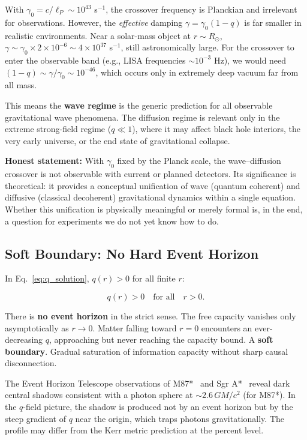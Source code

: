 \documentclass[aps,prd,twocolumn,showpacs,superscriptaddress,preprintnumbers]{revtex4-2}
\begin{document}
With $\gamma_0=c/\ell_P\sim10^{43}$ s$^{-1}$, the crossover frequency is Planckian and irrelevant for observations.
However, the \emph{effective} damping $\gamma=\gamma_0(1-q)$ is far smaller in realistic environments.
Near a solar-mass object at $r\sim R_\odot$, $\gamma\sim\gamma_0\times2\times10^{-6}\sim4\times10^{37}$ s$^{-1}$, still astronomically large.
For the crossover to enter the observable band (e.g., LISA frequencies $\sim10^{-3}$ Hz), we would need $(1-q)\sim\gamma/\gamma_0\sim10^{-46}$, which occurs only in extremely deep vacuum far from all mass.

This means the \textbf{wave regime} is the generic prediction for all observable gravitational wave phenomena.
The diffusion regime is relevant only in the extreme strong-field regime ($q\ll1$), where it may affect black hole interiors, the very early universe, or the end state of gravitational collapse.

\textbf{Honest statement:} With $\gamma_0$ fixed by the Planck scale, the wave--diffusion crossover is not observable with current or planned detectors.
Its significance is theoretical: it provides a conceptual unification of wave (quantum coherent) and diffusive (classical decoherent) gravitational dynamics within a single equation. Whether this unification is physically meaningful or merely formal is, in the end, a question for experiments we do not yet know how to do.

\subsection{Soft Boundary: No Hard Event Horizon}

In Eq.~\eqref{eq:q_solution}, $q(r)>0$ for all finite $r$:

\begin{equation}
q(r) > 0 \quad \text{for all} \quad r > 0.
\label{eq:soft}
\end{equation}

There is \textbf{no event horizon} in the strict sense.
The free capacity vanishes only asymptotically as $r\to0$.
Matter falling toward $r=0$ encounters an ever-decreasing $q$, approaching but never reaching the capacity bound.
A \textbf{soft boundary}. Gradual saturation of information capacity without sharp causal disconnection.

The Event Horizon Telescope observations of M87*~\cite{EventHorizonTelescope:2019dse} and Sgr A*~\cite{EventHorizonTelescope:2022xnr} reveal dark central shadows consistent with a photon sphere at $\sim2.6\,GM/c^2$ (for M87*).
In the $q$-field picture, the shadow is produced not by an event horizon but by the steep gradient of $q$ near the origin, which traps photons gravitationally.
The profile may differ from the Kerr metric prediction at the percent level.
\end{document}

